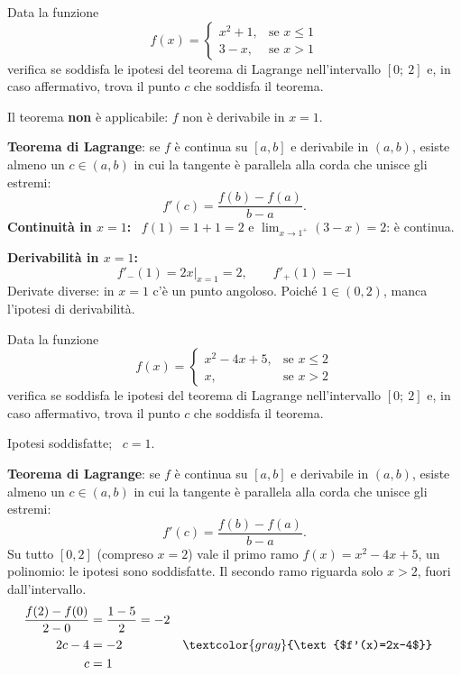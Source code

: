 
\begin{question}[ID=1.3, subtitle={Teorema di Lagrange non applicabile: funzione a tratti su $[0,2]$}, tags={lagrange, teoremi, non applicabile}, difficulty=media]
Data la funzione
\[
f(x) = \begin{cases}
x^2 + 1, & \text{se } x \leq 1 \\
3 - x, & \text{se } x > 1
\end{cases}
\]
verifica se soddisfa le ipotesi del teorema di Lagrange nell'intervallo \([0;\ 2]\) e, in caso affermativo, trova il punto \(c\) che soddisfa il teorema.
\begin{solution}
Il teorema \textbf{non} è applicabile: $f$ non è derivabile in $x=1$.
\end{solution}
\begin{explanation}
\textbf{Teorema di Lagrange}: se $f$ è continua su $[a,b]$ e derivabile in $(a,b)$, esiste almeno un $c\in(a,b)$ in cui la tangente è parallela alla corda che unisce gli estremi:
\[ f'(c)=\dfrac{f(b)-f(a)}{b-a}. \]
\textbf{Continuità in $x=1$:} \ $f(1)=1+1=2$ e $\displaystyle\lim_{x\to1^+}(3-x)=2$: è continua.

\textbf{Derivabilità in $x=1$:}
\[ f'_-(1)=2x\big|_{x=1}=2, \qquad f'_+(1)=-1 \]
Derivate diverse: in $x=1$ c'è un punto angoloso. Poiché $1\in(0,2)$, manca l'ipotesi di derivabilità.
\end{explanation}
\end{question}


\begin{question}[ID=1.4, subtitle={Teorema di Lagrange per funzione a tratti su $[0,2]$}, tags={lagrange, teoremi}, difficulty=media]
Data la funzione
\[
f(x) = \begin{cases}
x^2 -4x+5, & \text{se } x \leq 2 \\
x, & \text{se } x > 2
\end{cases}
\]
verifica se soddisfa le ipotesi del teorema di Lagrange nell'intervallo \([0;\ 2]\) e, in caso affermativo, trova il punto \(c\) che soddisfa il teorema.
\begin{solution}
Ipotesi soddisfatte; \ $c=1$.
\end{solution}
\begin{explanation}
\textbf{Teorema di Lagrange}: se $f$ è continua su $[a,b]$ e derivabile in $(a,b)$, esiste almeno un $c\in(a,b)$ in cui la tangente è parallela alla corda che unisce gli estremi:
\[ f'(c)=\dfrac{f(b)-f(a)}{b-a}. \]
Su tutto $[0,2]$ (compreso $x=2$) vale il primo ramo $f(x)=x^2-4x+5$, un polinomio: le ipotesi sono soddisfatte. Il secondo ramo riguarda solo $x>2$, fuori dall'intervallo.
\[\begin{aligned}
\dfrac{f(2)-f(0)}{2-0} &= \dfrac{1-5}{2}=-2\\
2c-4 &= -2 && \textcolor{gray}{\text{$f'(x)=2x-4$}}\\
c &= 1
\end{aligned}\]
\end{explanation}
\end{question}

